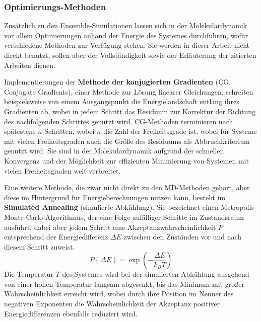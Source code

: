 \subsubsection{Optimierungs-Methoden}
\label{conjugategradient}
\label{annealing}

Zusätzlich zu den Ensemble-Simulationen lassen sich in der Molekulardynamik vor allem Optimierungen anhand der Energie des Systemes durchführen, wofür verschiedene Methoden zur Verfügung stehen.
Sie werden in dieser Arbeit nicht direkt benutzt, sollen aber der Vollständigkeit sowie der Erläuterung der zitierten Arbeiten dienen.

Implementierungen der \textbf{Methode der konjugierten Gradienten} (CG, Conjugate Gradients)\cite{press_numerical_2007}, einer Methode zur Lösung linearer Gleichungen, schreiten beispielsweise von einem Ausgangspunkt die Energielandschaft entlang ihres Gradienten ab, wobei in jedem Schritt das Residuum zur Korrektur der Richtung des nachfolgenden Schrittes genutzt wird.
CG-Methoden terminieren nach spätestens $n$ Schritten, wobei $n$ die Zahl der Freiheitsgrade ist, wobei für Systeme mit vielen Freiheitsgraden auch die Größe des Residuums als Abbruchkriterium genutzt wird.
Sie sind in der Molekulardynamik aufgrund der schnellen Konvergenz und der Möglichkeit zur effizienten Minimierung von Systemen mit vielen Freiheitsgraden weit verbreitet.

Eine weitere Methode, die zwar nicht direkt zu den MD-Methoden gehört, aber diese im Hintergrund für Energieberechnungen nutzen kann, besteht im \textbf{Simulated Annealing} (simulierte Abkühlung).
Sie bezeichnet einen Metropolis-Monte-Carlo-Algorithmus, der eine Folge zufälliger Schritte im Zustandsraum ausführt, dabei aber jedem Schritt eine Akzeptanzwahrscheinlichkeit $P$ entsprechend der Energiedifferenz $\Delta E$ zwischen den Zuständen vor und nach diesem Schritt zuweist.
\begin{equation}
  P(\Delta E) = \exp(-\frac{\Delta E}{k_B T})
\end{equation}
Die Temperatur $T$ des Systemes wird bei der simulierten Abkühlung ausgehend von einer hohen Temperatur langsam abgesenkt, bis das Minimum mit großer Wahrscheinlichkeit erreicht wird, wobei durch ihre Position im Nenner des negativen Exponenten die Wahrscheinlichkeit der Akzeptanz positiver Energiedifferenzen ebenfalls reduziert wird.



